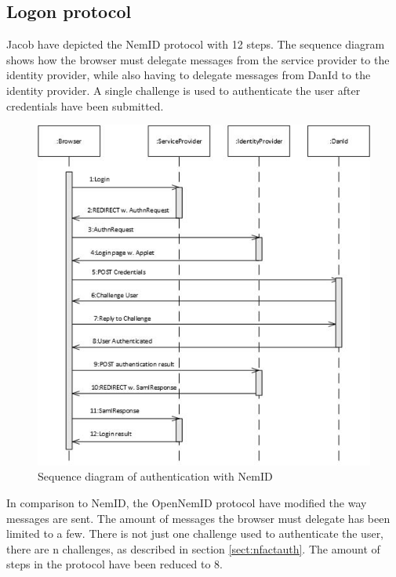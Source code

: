 \documentclass[twosided]{report}
\begin{document}
\subsection{Logon protocol}
Jacob have depicted the NemID protocol with 12 steps. The sequence diagram shows how the browser must delegate messages from the service provider to the identity provider, while also having to delegate messages from DanId to the identity provider. A single challenge is used to authenticate the user after credentials have been submitted.

\begin{figure}[H]
	\centering
	\includegraphics{images/Sequence-login-Jacob.jpg}
	\caption[Sequence diagram of authentication with NemID]{Sequence diagram of authentication with NemID \cite{jacob}}
\end{figure}

In comparison to NemID, the OpenNemID protocol have modified the way messages are sent. The amount of messages the browser must delegate has been limited to a few. There is not just one challenge used to authenticate the user, there are n challenges, as described in section \ref{sect:nfactauth}. The amount of steps in the protocol have been reduced to 8.
\end{document}
